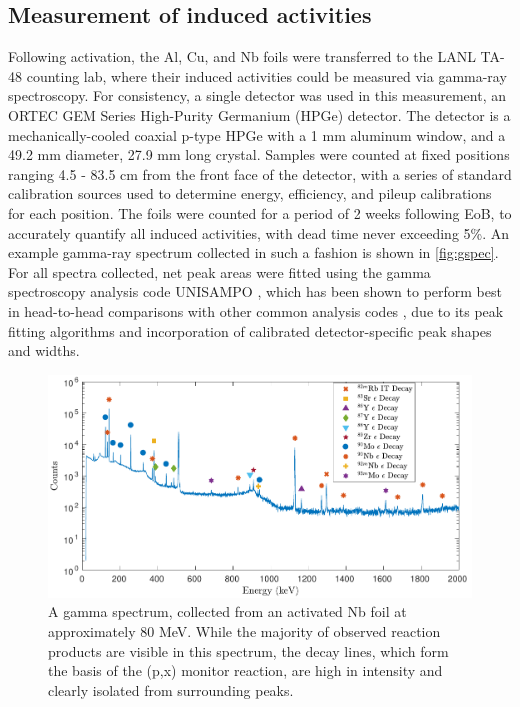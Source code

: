 \documentclass[3p]{elsarticle}
\begin{document}
\subsection{Measurement of induced activities}\label{sec:spectroscopy}


Following activation, the Al, Cu, and Nb foils  were  transferred to the LANL TA-48 counting lab, where their induced activities could be measured via gamma-ray spectroscopy.
For consistency, a single detector was used in this measurement, an ORTEC GEM Series  High-Purity Germanium (HPGe) detector.
The detector is a mechanically-cooled coaxial p-type HPGe with a 1 mm aluminum window, and a 49.2 mm diameter, 27.9 mm long crystal.
Samples were counted at fixed positions ranging 4.5 - 83.5  cm from the front face of the detector, with a series of standard calibration sources used to determine energy, efficiency, and pileup calibrations for each position.
The foils were counted  for a period of 2 weeks following EoB, to accurately quantify all induced activities,  with dead time never exceeding 5\%.
An example gamma-ray spectrum collected in such a fashion is shown in \autoref{fig:gspec}.
For all spectra collected, net peak areas were fitted using the gamma spectroscopy analysis code UNISAMPO \cite{Aarnio2001}, which has been shown to perform best in head-to-head comparisons with other common analysis codes \cite{Jackman2014}, due to its peak fitting algorithms and incorporation  of calibrated detector-specific peak shapes and widths. 

\begin{figure}
 \centering
 \includegraphics[width=6in]{./figures/sample_gspec.pdf}
 \caption{A gamma spectrum, collected from an activated Nb foil at approximately 80 MeV. While the majority of observed reaction products are visible in this spectrum,  the  decay lines, which form the basis of the (p,x) monitor reaction, are high in intensity and clearly isolated from surrounding peaks.}
 \label{fig:gspec}
\end{figure}
\end{document}
